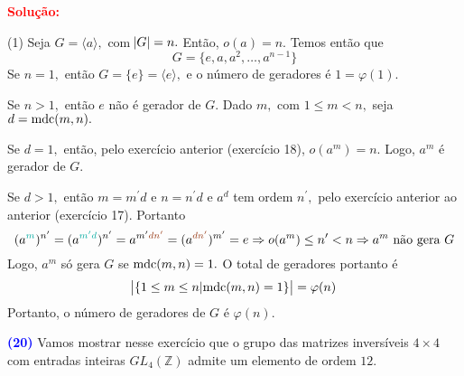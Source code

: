 \documentclass[12pt, a4paper]{article}
\newcommand{\mdc}{{\rm mdc}}
\newcommand{\negrito}[1]{\mbox{\boldmath{$#1$}}}
\begin{document}
\textbf{\textcolor{red}{Solução:}} \begin{tasks}[counter-format={(tsk[a])},label-width=3.6ex, label-format = {\bfseries}, column-sep = {0pt}](1)
\task[\textcolor{Floresta}{$\negrito{(a)} $}]
\task[\textcolor{Floresta}{$\negrito{(b)} $}]
\task[\textcolor{Floresta}{$\negrito{(c)} $}] Seja $G = \langle a \rangle,$ com $\abs{G} = n.$ Então, $o(a) = n.$ Temos então que
\[
G = \{ e,a, a^2, \ldots, a^{n-1} \}
\]
Se $n = 1,$ então $G = \{ e \} = \langle e \rangle,$ e o número de geradores é $1 = \varphi(1).$

Se $n > 1,$ então $e$ não é gerador de $G.$ Dado $m,$ com $1 \le m < n,$ seja $d = \mdc(m,n).$ 

Se $d = 1,$ então, pelo exercício anterior (exercício 18), $o(a^m) = n.$ Logo, $a^m$ é gerador de $G.$ 

Se $d > 1,$ então $m = m^{\prime} d$ e $n = n^{\prime} d$ e $a^d$ tem ordem $n^{\prime},$ pelo exercício anterior ao anterior (exercício 17). Portanto
\[
(a^{\textcolor{Emerald}{m}})^{n^{\prime}} = (a^{\textcolor{Emerald}{m^{\prime}d}})^{n^{\prime}} = a^{m^{\prime}\textcolor{RawSienna}{dn^{\prime}}} = (a^{\textcolor{RawSienna}{dn^{\prime}}})^{m^{\prime}} = e \Rightarrow o(a^m) \le n^{\prime} < n \Rightarrow a^m \mbox{ não gera } G
\]
Logo, $a^m$ só gera $G$ se $\mdc(m,n) = 1.$ O total de geradores portanto é
\[
\abs{\{1 \le m \le n | \mdc(m,n) = 1 \}} = \varphi(n)
\]
Portanto, o número de geradores de $G$ é $\varphi(n).$
\end{tasks}
\textcolor{blue}{\bf(20)}\label{27} Vamos mostrar nesse exercício que o grupo das matrizes inversíveis $4 \times 4$ com entradas inteiras $GL_4(\mathbb{Z})$ admite um elemento de ordem $12.$%
\end{document}
